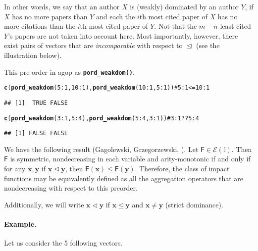 \documentclass[11pt]{article}\usepackage{graphicx, color}
\makeatletter
\newcommand{\hlfunctioncall}[1]{\textcolor[rgb]{0.501960784313725,0,0.329411764705882}{\textbf{#1}}}%
\newcommand{\hlcomment}[1]{\textcolor[rgb]{0.180392156862745,0.6,0.341176470588235}{#1}}%
\newenvironment{kframe}{%
 \def\at@end@of@kframe{}%
 \ifinner\ifhmode%
  \def\at@end@of@kframe{\end{minipage}}%
  \begin{minipage}{\columnwidth}%
 \fi\fi%
 \def\FrameCommand##1{\hskip\@totalleftmargin \hskip-\fboxsep
 \colorbox{shadecolor}{##1}\hskip-\fboxsep
     \hskip-\linewidth \hskip-\@totalleftmargin \hskip\columnwidth}%
 \MakeFramed {\advance\hsize-\width
   \@totalleftmargin\z@ \linewidth\hsize
   \@setminipage}}%
 {\par\unskip\endMakeFramed%
 \at@end@of@kframe}
\newenvironment{knitrout}{}{} %
\newcommand{\package}[1]{\textsf{#1}\xspace}
\newcommand{\Rfunc}[1]{\texttt{\hlfunctioncall{#1}}}
\newcommand{\vect}[1]{{\mathbf{#1}}}
\newcommand{\func}[1]{{\mathsf{#1}}}
\newcommand{\Ival}{\mathbb{I}}
\theoremstyle{remark}
\theoremstyle{definition}
\makeatother
\begin{document}
In other words, we  say that an author $X$
 is (weakly) dominated %
by an author $Y$, if $X$ has no more papers than $Y$ and each
the $i$th most cited paper of $X$ has no more citations than
the $i$th most cited paper of $Y$. Not that the $m-n$ least cited
$Y$'s papers are not taken into account here.
Most importantly, however,
there exist pairs of vectors
that are \textit{incomparable} with respect to $\trianglelefteq$ (see
the illustration below).

This pre-order in \package{agop} as \Rfunc{pord\_weakdom()}.

\begin{knitrout}\small
{}\color{fgcolor}\begin{kframe}
\begin{alltt}
\hlfunctioncall{c}(\hlfunctioncall{pord_weakdom}(5:1, 10:1), \hlfunctioncall{pord_weakdom}(10:1, 5:1)) \hlcomment{# 5:1 <= 10:1}
\end{alltt}
\begin{verbatim}
## [1]  TRUE FALSE
\end{verbatim}
\begin{alltt}
\hlfunctioncall{c}(\hlfunctioncall{pord_weakdom}(3:1, 5:4),  \hlfunctioncall{pord_weakdom}(5:4, 3:1))  \hlcomment{# 3:1 ?? 5:4}
\end{alltt}
\begin{verbatim}
## [1] FALSE FALSE
\end{verbatim}
\end{kframe}
\end{knitrout}


We have the following result
(Gagolewski, Grzegorzewski, \cite{GagolewskiGrzegorzewski2011:ijar}).
Let $\func{F}\in \mathcal{E}(\Ival)$. Then $\func{F}$
is symmetric, nondecreasing in each variable
and arity-monotonic if and only if for any $\vect{x},\vect{y}$
if $\vect{x}\trianglelefteq\vect{y}$, then
$\func{F}(\vect{x})\le \func{F}(\vect{y})$.
Therefore, the class of  impact functions may be equivalently
defined as all the aggregation operators
that are nondecreasing with respect to this preorder.


Additionally, we will write $\vect{x}\vartriangleleft\vect{y}$ if
$\vect{x}\trianglelefteq\vect{y}$ and $\vect{x}\neq\vect{y}$
(strict dominance).


\paragraph{Example.} Let us consider the 5 following vectors.
\end{document}
